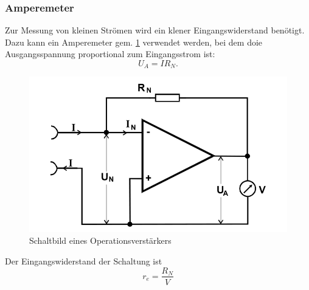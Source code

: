 \subsubsection{Amperemeter}
Zur Messung von kleinen Strömen wird ein klener Eingangswiderstand benötigt. Dazu kann ein Amperemeter gem. \ref{abb:ampere} verwendet werden, bei dem doie Ausgangsspannung proportional zum Eingangsstrom ist:
\begin{equation}
U_A = IR_N.
\end{equation}
\begin{figure}
 	\centering
 	\includegraphics[width=\textwidth]{img/ampere.png}
 	\caption{Schaltbild eines Operationsverstärkers \cite{FP}}
 	\label{abb:ampere}
\end{figure}
Der Eingangswiderstand der Schaltung ist
\begin{equation}
r_e = \frac{R_N}{V}
\end{equation}

